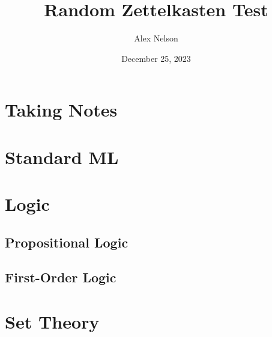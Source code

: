 \documentclass[dvipsnames,HTML]{amsbook}%
\title{Random Zettelkasten Test}
\author{Alex Nelson}
\date{December 25, 2023}
\begin{document}
\frontmatter
\maketitle
\tableofcontents
\mainmatter
\vfill\eject
\chapter{Taking Notes}


\chapter{Standard ML}


\chapter{Logic}
\section{Propositional Logic}

\section{First-Order Logic}


\chapter{Set Theory}

% 

\backmatter
\nocite{*}

\end{document}
